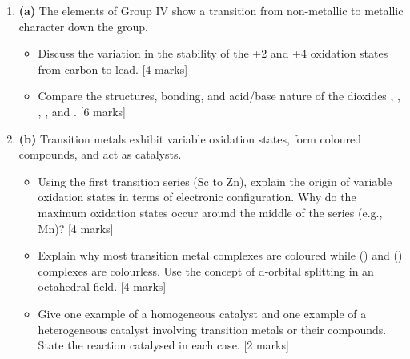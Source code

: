\documentclass[11pt]{article}
\begin{document}
\begin{exercice}
\begin{enumerate}
\item \textbf{(a)} The elements of Group IV show a transition from non-metallic to metallic character down the group.
      \begin{itemize}
      \item Discuss the variation in the stability of the +2 and +4 oxidation states from carbon to lead. \hfill [4 marks]
      \item Compare the structures, bonding, and acid/base nature of the dioxides , , , , and . \hfill [6 marks]
      \end{itemize}
\item \textbf{(b)} Transition metals exhibit variable oxidation states, form coloured compounds, and act as catalysts.
      \begin{itemize}
      \item Using the first transition series (Sc to Zn), explain the origin of variable oxidation states in terms of electronic configuration. Why do the maximum oxidation states occur around the middle of the series (e.g., Mn)? \hfill [4 marks]
      \item Explain why most transition metal complexes are coloured while  () and  () complexes are colourless. Use the concept of d-orbital splitting in an octahedral field. \hfill [4 marks]
      \item Give one example of a homogeneous catalyst and one example of a heterogeneous catalyst involving transition metals or their compounds. State the reaction catalysed in each case. \hfill [2 marks]
      \end{itemize}
\end{enumerate}
\end{exercice}
\end{document}
